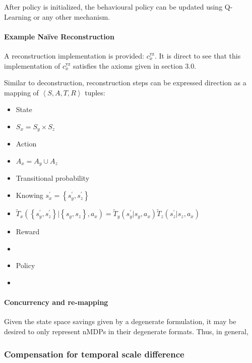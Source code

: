\documentclass[compsoc,journal,letterpaper,10pt,draftcls,twocolumn]{IEEEtran}
\begin{document}
After policy is initialized, the behavioural policy can be updated using
Q-Learning or any other mechanism.

 
\paragraph{Example Na\"{i}ve
Reconstruction}\label{example-nauxefve-reconstruction}

A reconstruction implementation is provided: \(c_{x}^{\text{yz}}\). It
is direct to see that this implementation of \(c_{x}^{\text{yz}}\)
satisfies the axioms given in section 3.0.

Similar to deconstruction, reconstruction steps can be expressed
direction as a mapping of \(\left\langle S,A,T,R \right\rangle\) tuples:

\begin{itemize}
\item
  State
\item
  \(S_{x} = S_{y} \times S_{z}\)
\item
  Action
\item
  \(A_{x} = A_{y} \cup A_{z}\)
\item
  Transitional probability
\item
  Knowing \(s_{x}^{'} = \left\{ s_{y}^{'},s_{z}^{'} \right\}\)
\item
  \({\tilde{T}}_{x}\left( \left\{ s_{y}^{'},s_{z}^{'} \right\}|\left\{ s_{y}^{\ },s_{z}^{\ } \right\},a_{x} \right) = {\tilde{T}}_{y}\left( s_{y}^{'}|s_{y}^{\ },a_{x} \right){\tilde{T}}_{z}\left( s_{z}^{'}|s_{z}^{\ },a_{x} \right)\)
\item
  Reward
\item
\item
  Policy
\item
\end{itemize} 

\paragraph{Concurrency and
re-mapping}\label{concurrency-and-re-mapping}

Given the state space savings given by a degenerate formulation, it may
be desired to only represent nMDPs in their degenerate formats. Thus, in
general,

\subsubsection{Compensation for temporal scale
difference}\label{compensation-for-temporal-scale-difference}
\end{document}
